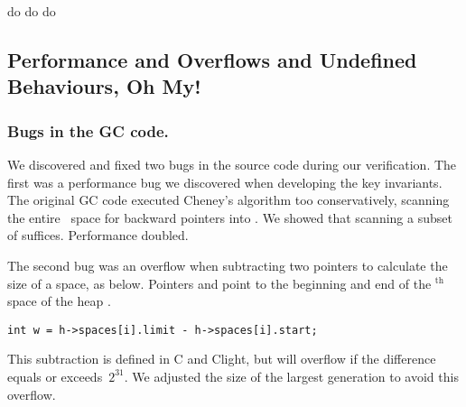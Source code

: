 do do do

\subsection{Performance and Overflows and Undefined Behaviours, Oh My!} \label{sec:gcissues}

\subsubsection*{Bugs in the GC code.}
We discovered and fixed two bugs in the source code during our verification.
The first was a performance bug we discovered when developing the key invariants.
The original GC code executed Cheney's algorithm too conservatively,
scanning the entire~ space for backward pointers into . We
showed that scanning a subset of  suffices.  Performance doubled.

The second bug was an overflow when subtracting two pointers
to calculate the size of a space, as below. Pointers  and 
point to the beginning and end of the $^{\text{th}}$ space of the
heap .
\begin{lstlisting}[numbers=none]
  int w = h->spaces[i].limit - h->spaces[i].start;
\end{lstlisting}
This subtraction is defined in C and Clight, but
will overflow if the difference equals
or exceeds~$2^{31}$. We adjusted the size of the largest generation to avoid this overflow.

